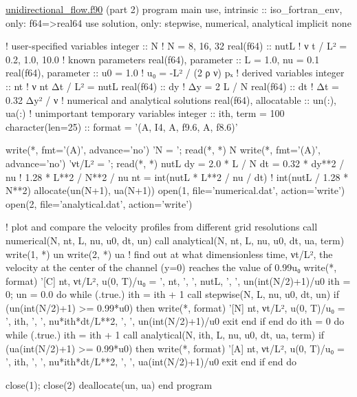 \begin{fortran}[label={C:2-2-2}]{\href{https://github.com/iydon/CFDRust/blob/main/mae5005/code/2/unidirectional_flow.f90}{unidirectional\_flow.f90} (part 2)}
program main
   use, intrinsic :: iso_fortran_env, only: f64=>real64
   use solution, only: stepwise, numerical, analytical
   implicit none

   ! user-specified variables
   integer :: N ! N = 8, 16, 32
   real(f64) :: nutL ! ν t / L² = 0.2, 1.0, 10.0
   ! known parameters
   real(f64), parameter :: L = 1.0, nu = 0.1
   real(f64), parameter :: u0 = 1.0 ! u₀ = -L² / (2 ρ ν) pₓ
   ! derived variables
   integer :: nt ! ν nt Δt / L² = nutL
   real(f64) :: dy ! Δy = 2 L / N
   real(f64) :: dt ! Δt = 0.32 Δy² / ν
   ! numerical and analytical solutions
   real(f64), allocatable :: un(:), ua(:)
   ! unimportant temporary variables
   integer :: ith, term = 100
   character(len=25) :: format = '(A, I4, A, f9.6, A, f8.6)'

   write(*, fmt='(A)', advance='no') 'N     = '; read(*, *) N
   write(*, fmt='(A)', advance='no') 'νt/L² = '; read(*, *) nutL
   dy = 2.0 * L / N
   dt = 0.32 * dy**2 / nu ! 1.28 * L**2 / N**2 / nu
   nt = int(nutL * L**2 / nu / dt) ! int(nutL / 1.28 * N**2)
   allocate(un(N+1), ua(N+1))
   open(1, file='numerical.dat', action='write')
   open(2, file='analytical.dat', action='write')

   ! plot and compare the velocity profiles from different grid resolutions
   call numerical(N, nt, L, nu, u0, dt, un)
   call analytical(N, nt, L, nu, u0, dt, ua, term)
   write(1, *) un
   write(2, *) ua
   ! find out at what dimensionless time, νt/L², the velocity at the center of the channel (y=0) reaches the value of 0.99u₀
   write(*, format) '[C] nt, νt/L², u(0, T)/u₀ = ', nt, ', ', nutL, ', ', un(int(N/2)+1)/u0
   ith = 0; un = 0.0
   do while (.true.)
      ith = ith + 1
      call stepwise(N, L, nu, u0, dt, un)
      if (un(int(N/2)+1) >= 0.99*u0) then
         write(*, format) '[N] nt, νt/L², u(0, T)/u₀ = ', ith, ', ', nu*ith*dt/L**2, ', ', un(int(N/2)+1)/u0
         exit
      end if
   end do
   ith = 0
   do while (.true.)
      ith = ith + 1
      call analytical(N, ith, L, nu, u0, dt, ua, term)
      if (ua(int(N/2)+1) >= 0.99*u0) then
         write(*, format) '[A] nt, νt/L², u(0, T)/u₀ = ', ith, ', ', nu*ith*dt/L**2, ', ', ua(int(N/2)+1)/u0
         exit
      end if
   end do

   close(1); close(2)
   deallocate(un, ua)
end program
\end{fortran}



